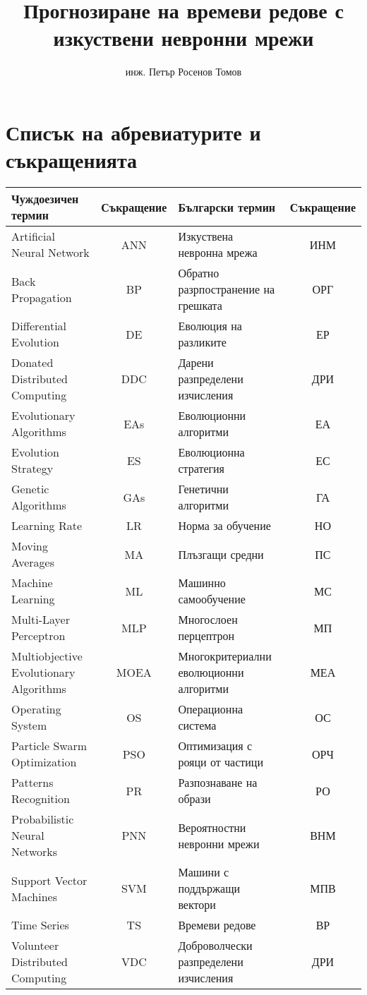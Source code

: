 \documentclass[14pt,a4paper,openany]{book}
\title{Прогнозиране на времеви редове с изкуствени невронни мрежи}
\author{инж. Петър Росенов Томов}
\begin{document}

\thispagestyle{empty}

\setcounter{page}{1}

\tableofcontents

\chapter*{Списък на абревиатурите и съкращенията}

\begin{tabular}{ | p{3.75cm} | c | p{3.75cm} | c | }
\hline
\cellcolor{gray!15}Чуждоезичен термин & \cellcolor{gray!15}Съкращение & \cellcolor{gray!15}Български термин & \cellcolor{gray!15}Съкращение \\ [0.05ex] 
\hline
\hline
Artificial Neural Network & ANN & Изкуствена невронна мрежа & ИНМ \\  
\hline
Back Propagation  & BP & Обратно разрпостранение на грешката & ОРГ \\  
\hline
Differential Evolution & DE & Еволюция на разликите & ЕР \\ 
\hline
Donated Distributed Computing & DDC & Дарени разпределени изчисления & ДРИ \\  
\hline
Evolutionary Algorithms & EAs & Еволюционни алгоритми & ЕА \\  
\hline
Evolution Strategy & ES & Еволюционна стратегия & ЕС \\  
\hline
Genetic Algorithms & GAs & Генетични алгоритми & ГА \\  
\hline
Learning Rate & LR & Норма за обучение & НО \\  
\hline
Moving Averages & MA & Плъзгащи средни & ПС \\  
\hline
Machine Learning & ML & Машинно самообучение & МС \\  
\hline
Multi-Layer Perceptron & MLP & Многослоен перцептрон & МП \\  
\hline
Multiobjective Evolutionary Algorithms & MOEA & Многокритериални еволюционни алгоритми & МЕА \\  
\hline
Operating System & OS & Операционна система & ОС \\  
\hline
Particle Swarm Optimization & PSO & Оптимизация с рояци от частици & ОРЧ \\  
\hline
Patterns Recognition & PR & Разпознаване на образи & РО \\  
\hline
Probabilistic Neural Networks & PNN & Вероятностни невронни мрежи & ВНМ \\  
\hline
Support Vector Machines & SVM & Машини с поддържащи вектори & МПВ \\  
\hline
Time Series & TS & Времеви редове & ВР \\  
\hline
Volunteer Distributed Computing & VDC & Доброволчески разпределени изчисления & ДРИ \\  
\hline
\end{tabular}
\end{document}
